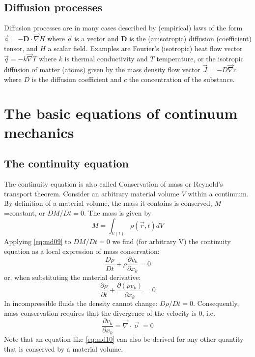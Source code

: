 \vspace{0.5cm}
\vspace{0.5cm}

\subsection{Diffusion processes} 

Diffusion processes are in many cases described by (empirical) 
laws of the form $\vec{a} = -{\bm D} \cdot \vec\nabla H$
where $\vec{a}$ is a vector and ${\bm D}$ 
is the (anisotropic) diffusion (coefficient) tensor,
and $H$ a scalar field. 
Examples are Fourier’s (isotropic) heat flow vector 
$\vec{q} = -k \vec\nabla T$
where $k$ is thermal conductivity and $T$ temperature, 
or the isotropic diffusion of matter
(atoms) given by the mass density flow vector $\vec{J} = -D \vec\nabla c$
where $D$ is the diffusion
coefficient and $c$ the concentration of the substance.


\section{The basic equations of continuum mechanics}

\subsection{The continuity equation} 

The continuity equation is also called Conservation of mass or 
Reynold’s transport theorem.
Consider an arbitrary material volume $V$ within a continuum. 
By definition of a material
volume, the mass it contains is conserved, $M$=constant, or
$DM/Dt=0$.
The mass is given by
\[
M=\int_{V(t)} \rho(\vec{r},t) dV
\]
Applying \eqref{eq:md09} to $DM/Dt=0$ we find 
(for arbitrary V) the continuity
equation as a local expression of mass conservation:
\begin{equation}
\frac{D\rho}{Dt} + \rho \frac{\partial v_k}{\partial x_k} =0
\label{eq:md10}
\end{equation}
or, when substituting the material derivative:
\[
\frac{\partial \rho}{\partial t} + \frac{\partial (\rho v_k)}{\partial x_k} =0
\]
In incompressible fluids the density cannot change: $D\rho/Dt=0$.
Consequently, mass
conservation requires that the divergence of the velocity is 0, i.e.
\[
\frac{\partial v_k}{\partial x_k} = \vec\nabla \cdot \vec\upnu = 0
\]
Note that an equation like \eqref{eq:md10}
can also be derived for any other quantity that is
conserved by a material volume.


